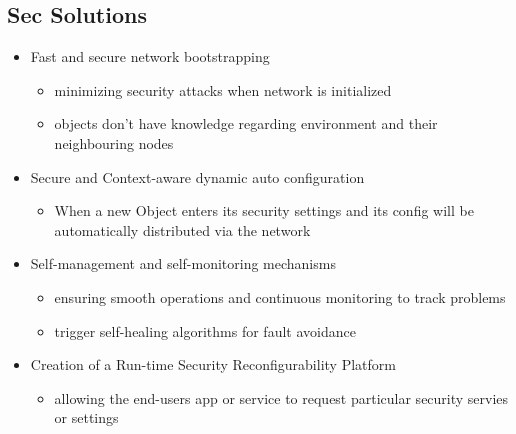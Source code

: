 \documentclass[a4paper, 12pt]{article}
\begin{document}
\subsection{Sec Solutions}
\begin{itemize}
\item Fast and secure network bootstrapping
\begin{itemize}
\item minimizing security attacks when network is initialized
\item objects don't have knowledge regarding environment and their neighbouring nodes
\end{itemize}
\item Secure and Context-aware dynamic auto configuration
\begin{itemize}
\item When a new Object enters its security settings and its config will be automatically distributed via the network
\end{itemize}
\item Self-management and self-monitoring mechanisms
\begin{itemize}
\item ensuring smooth operations and continuous monitoring to track problems
\item trigger self-healing algorithms for fault avoidance
\end{itemize}
\item Creation of a Run-time Security Reconfigurability Platform
\begin{itemize}
\item allowing the end-users app or service to request particular security servies or settings
\end{itemize}
\end{itemize}
\end{document}
